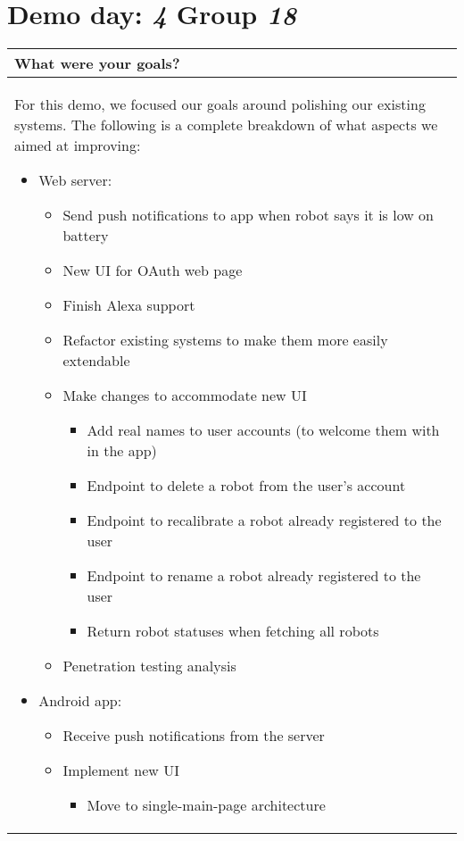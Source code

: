 \documentclass[a4paper]{article}
\newcommand{\colWidth}{141mm}
\begin{document}
 
\section*{Demo day: \textit{4} Group \textit{18}}


\begin{center}
\begin{tabular}{|p{\colWidth}|}
	\hline
	\cellcolor{blue!25}\large
	\textbf{What were your goals?}
	\\ \hline
	
		For this demo, we focused our goals around polishing our existing systems.
		The following is a complete breakdown of what aspects we aimed at improving:
		\begin{itemize}
			\item Web server:
			\begin{itemize}
				\item Send push notifications to app when robot says it is low on battery
				\item New UI for OAuth web page
				\item Finish Alexa support
				\item Refactor existing systems to make them more easily extendable
				\item Make changes to accommodate new UI
				\begin{itemize}
					\item Add real names to user accounts (to welcome them with in the app)
					\item Endpoint to delete a robot from the user's account
					\item Endpoint to recalibrate a robot already registered to the user
					\item Endpoint to rename a robot already registered to the user
					\item Return robot statuses when fetching all robots
				\end{itemize}
				\item Penetration testing analysis
			\end{itemize}
			\item Android app:
			\begin{itemize}
				\item Receive push notifications from the server
				\item Implement new UI
				\begin{itemize}
					\item Move to single-main-page architecture

\end{itemize}
\end{itemize}
\end{itemize}
\end{tabular}
\end{center}
\end{document}
